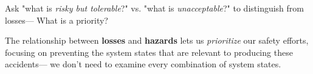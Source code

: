 \documentclass[a4paper]{tufte-book}
\begin{document}
\begin{landscape}
\begin{multicols}{2}

Ask "what is \emph{risky but tolerable}?" vs. "what is \emph{unacceptable}?" to distinguish from losses--- What is a priority?


The relationship between \textbf{losses} and \textbf{hazards} lets us \emph{prioritize} our safety efforts, focusing on preventing the system states that are relevant to producing these accidents--- we don't need to examine every combination of system states.

\end{multicols}
\end{landscape}
\end{document}
